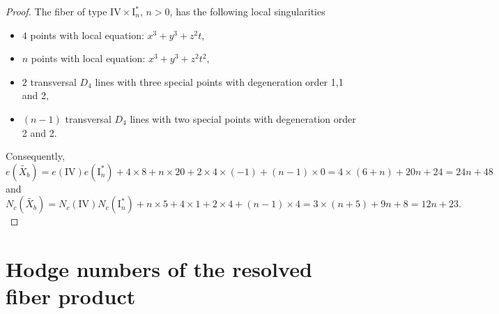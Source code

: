 \documentclass[a4paper]{amsart}
\theoremstyle{plain}
\theoremstyle{definition}
\theoremstyle{remark}
\numberwithin{equation}{section}
\begin{document}
\begin{proof}
The fiber of type $\mathrm{IV} \times \mathrm{I}_{n}^{*}$, $n>0$, has the following local singularities
\begin{itemize}
	\item [] $4$ points with local equation: $x^{3}+y^{3}+z^{2}t$,
	\item [] $n$ points with local equation: $x^{3}+y^{3}+z^{2}t^{2}$,
	\item [] $2$ transversal $D_{4}$ lines with three  special points with degeneration order 1,1 and 2,
	\item [] $(n-1)$ transversal $D_{4}$ lines with two special points with degeneration order 2 and 2.
\end{itemize}
Consequently,
\[
e(\widetilde{X_{b}}) = e(\mathrm{IV})e(\mathrm{I}_{n}^{*}) + 4\times 8 + n\times20 +2 \times 4\times (-1) + (n-1)\times 0 = 4\times (6+n) + 20n + 24 = 24n + 48
\]
and
\[
N_{c}(\widetilde{X_{b}}) = N_{c}(\mathrm{IV})N_{c}(\mathrm{I}_{n}^{*}) + n\times 5 + 4\times 1 + 2 \times 4 + (n-1) \times 4 = 3\times (n + 5) + 9n + 8 = 12n + 23.
\]
\end{proof}


\section{Hodge numbers of the resolved fiber product}
\end{document}
